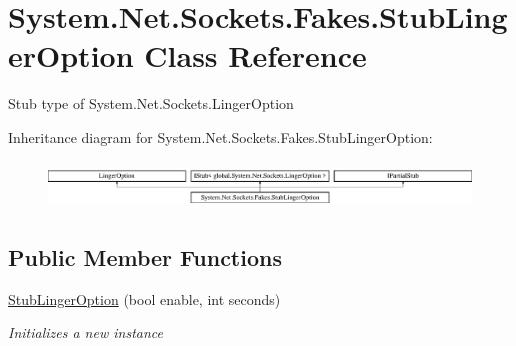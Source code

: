 \hypertarget{class_system_1_1_net_1_1_sockets_1_1_fakes_1_1_stub_linger_option}{\section{System.\-Net.\-Sockets.\-Fakes.\-Stub\-Linger\-Option Class Reference}
\label{class_system_1_1_net_1_1_sockets_1_1_fakes_1_1_stub_linger_option}
}


Stub type of System.\-Net.\-Sockets.\-Linger\-Option 


Inheritance diagram for System.\-Net.\-Sockets.\-Fakes.\-Stub\-Linger\-Option\-:\begin{figure}[H]
\begin{center}
\leavevmode
\includegraphics[height=1.252796cm]{class_system_1_1_net_1_1_sockets_1_1_fakes_1_1_stub_linger_option}
\end{center}
\end{figure}
\subsection*{Public Member Functions}
\begin{DoxyCompactItemize}
\item 
\hyperlink{class_system_1_1_net_1_1_sockets_1_1_fakes_1_1_stub_linger_option_a53ba25888e30007f05b3227358590a58}{Stub\-Linger\-Option} (bool enable, int seconds)
\begin{DoxyCompactList}\small\item\em Initializes a new instance\end{DoxyCompactList}\end{DoxyCompactItemize}
